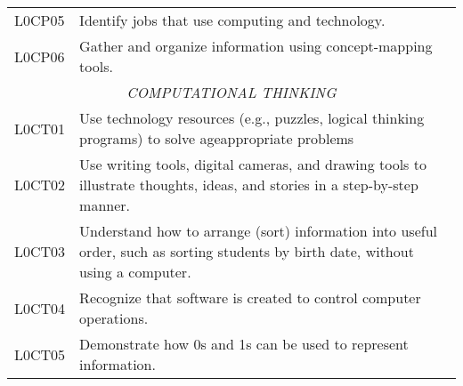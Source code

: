 \begin{longtable}{p{1.8cm}p{11cm}}
 L0CP05  & Identify jobs that use computing and technology.                                                                                                                                                                           \\
 L0CP06  & Gather and organize information using concept-mapping tools.                                                                                                                                                               \\
 \multicolumn{2}{c}{\textit{COMPUTATIONAL THINKING}}                                                     
 \\
 L0CT01  & Use technology resources (e.g., puzzles, logical thinking programs) to solve ageappropriate problems                                                                                                                       \\
 L0CT02  & Use writing tools, digital cameras, and drawing tools to illustrate thoughts, ideas, and stories in a step-by-step manner.                                                                                                 \\
 L0CT03  & Understand how to arrange (sort) information into useful order, such as sorting students by birth date, without using a computer.                                                                                          \\
 L0CT04  & Recognize that software is created to control computer operations.                                                                                                                                                         \\
 L0CT05  & Demonstrate how 0s and 1s can be used to represent information.                                                   
\end{longtable}																												

